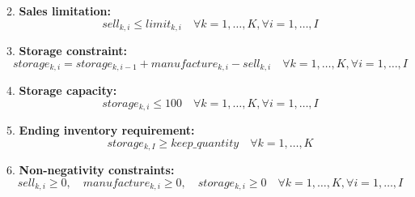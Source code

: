 \documentclass{article}
\begin{document}
2. \textbf{Sales limitation:}
\[
sell_{k, i} \leq limit_{k, i} \quad \forall k=1,\ldots,K, \forall i=1,\ldots,I
\]

3. \textbf{Storage constraint:}
\[
storage_{k, i} = storage_{k, i-1} + manufacture_{k, i} - sell_{k, i} \quad \forall k=1,\ldots,K, \forall i=1,\ldots,I
\]

4. \textbf{Storage capacity:}
\[
storage_{k, i} \leq 100 \quad \forall k=1,\ldots,K, \forall i=1,\ldots,I
\]

5. \textbf{Ending inventory requirement:}
\[
storage_{k, I} \geq keep\_quantity \quad \forall k=1,\ldots,K
\]

6. \textbf{Non-negativity constraints:}
\[
sell_{k, i} \geq 0, \quad manufacture_{k, i} \geq 0, \quad storage_{k, i} \geq 0 \quad \forall k=1,\ldots,K, \forall i=1,\ldots,I
\]
\end{document}
